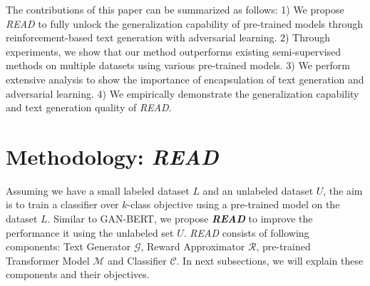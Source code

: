 \documentclass[11pt]{article}
\begin{document}

The contributions of this paper can be summarized as follows: 
1) We propose \textit{READ} to fully unlock the generalization capability of pre-trained models through reinforcement-based text generation with adversarial learning.
2) Through experiments, we show that our method outperforms existing semi-supervised methods on multiple datasets using various pre-trained models.
3) We perform extensive analysis to show the importance of encapsulation of text generation and adversarial learning.
4) We empirically demonstrate the generalization capability and text generation quality of \textit{READ}.


\section{Methodology: \textit{READ}}
Assuming we have a small labeled dataset $L$ and an unlabeled dataset $U$, the aim is to train a classifier over $k$-class objective using a pre-trained model on the dataset $L$. Similar to GAN-BERT, we propose \textbf{\textit{READ}} to improve the performance it using the unlabeled set $U$. \textit{READ} consists of following components: Text Generator $\mathcal{G}$, Reward Approximator $\mathcal{R}$, pre-trained Transformer Model $\mathcal{M}$ and Classifier $\mathcal{C}$. In next subsections, we will explain these components and their objectives.
\end{document}
